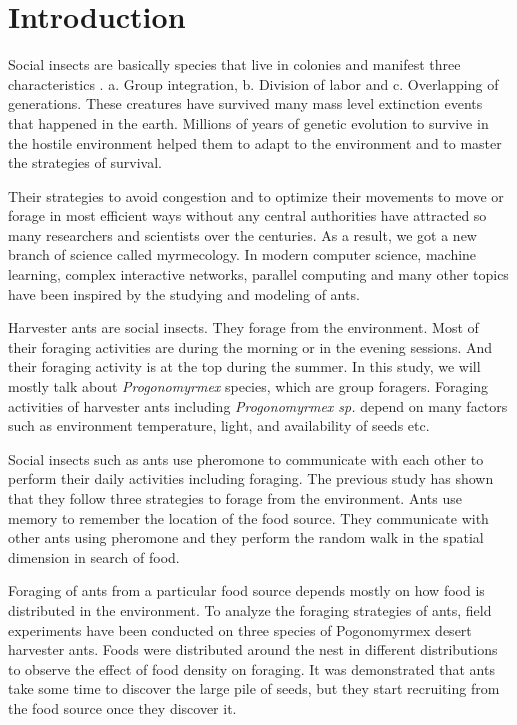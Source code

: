 \chapter{Introduction}
Social insects are basically species that live in colonies and manifest three characteristics \cite{SocialInsect}. a. Group integration\cite{anderson2001individual}, b. Division of labor\cite{beshers2001models} and c. Overlapping of generations\cite{wilson2005eusociality}. These creatures have survived many mass level extinction events that happened in the earth. Millions of years of genetic evolution to survive in the hostile environment helped them to adapt to the environment and to master the strategies of survival.  \par
Their strategies to avoid congestion and to optimize their movements to move or forage in most efficient ways without any central authorities have attracted so many researchers and scientists over the centuries\cite{narzt2010self}. As a result, we got a new branch of science called myrmecology. In modern computer science, machine learning\cite{dorigo1997ant}, complex interactive networks\cite{he2011ant}, parallel computing\cite{bonabeau2000inspiration} and many other topics have been inspired by the studying and modeling of ants. \par
Harvester ants are social insects. They forage from the environment. Most of their foraging activities are during the morning or in the evening sessions. And their foraging activity is at the top during the summer\cite{hobbs1985harvester, whitford1975factors}.  In this study, we will mostly talk about \textit{Progonomyrmex} species, which are group foragers\cite{whitford1978foraging}. Foraging activities of harvester ants including \textit{Progonomyrmex sp.} depend on many factors such as environment temperature, light, and availability of seeds\cite{whitford1975factors} etc.\par 
Social insects such as ants use pheromone to communicate with each other to perform their daily activities including foraging\cite{jackson2006communication}.
  The previous study has shown that they follow three strategies to forage from the environment\cite{flanagan2012quantifying}. Ants use memory to remember the location of the food source. They communicate with other ants using pheromone and they perform the random walk in the spatial dimension in search of food.\par 
  Foraging of ants from a particular food source depends mostly on how  food is distributed in the environment\cite{traniello1989foraging}. To analyze the foraging strategies of ants, field experiments have been conducted on three species of Pogonomyrmex desert harvester ants. Foods were distributed around the nest in different distributions to observe the effect of food density on foraging. It was demonstrated that ants take some time to discover the large pile of seeds, but they start recruiting from the food source once they discover it\cite{flanagan2012quantifying}. 

